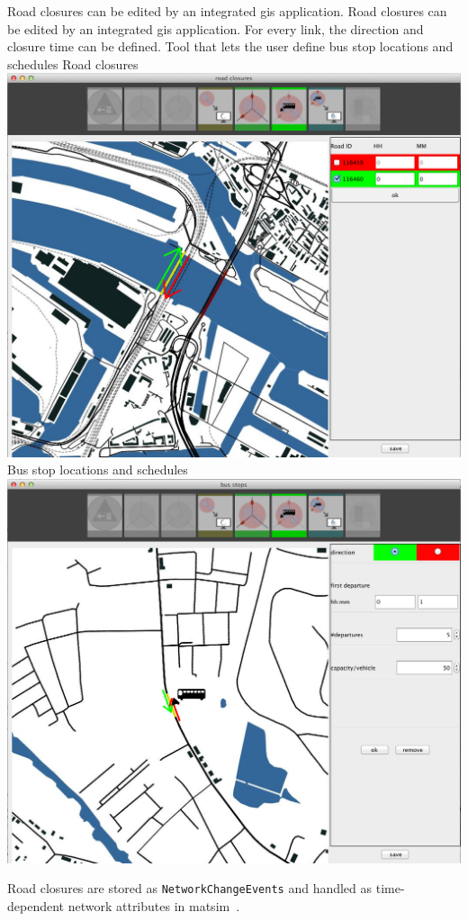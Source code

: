 \createfigure%
{Road closures can be edited by an integrated \protect\gls{gis} application.}%
{Road closures can be edited by an integrated \protect\gls{gis} application. For every link, the direction and closure time can be defined. Tool that lets the user define bus stop locations and schedules}%
{\label{fig:evac_editor}}%
{%
  \createsubfigure%
  {Road closures}%
{\includegraphics[width=.475\linewidth]{extending/figures/Evacuation/rd_closure_detail}}
  {}%
  {}%
  \createsubfigure%
  {Bus stop locations and schedules}%
{\includegraphics[width=.475\linewidth]{extending/figures/Evacuation/bus_stops}}
  {}%
  {}%
}%
  {}%

Road closures are stored as \lstinline|NetworkChangeEvents| and handled as time-dependent network attributes in \gls{matsim}~\citep{LaemmelGretherNagel2009TimeDependentNetworks}.

